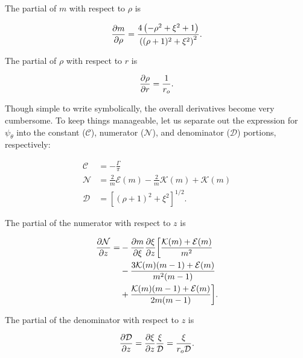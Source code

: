 \noindent The partial of \(m\) with respect to \(\rho\) is

\begin{equation}
    \frac{\partial m}{\partial \rho} = \frac{4\left(-\rho^2 + \xi^2 + 1\right)}{\left((\rho +1)^2 + \xi^2 \right)^2}.
\end{equation}

\noindent The partial of \(\rho\) with respect to \(r\) is

\begin{equation}
    \frac{\partial \rho}{\partial r} = \frac{1}{r_o}.
\end{equation}

Though simple to write symbolically, the overall derivatives become very cumbersome.
%
To keep things manageable, let us separate out the expression for \(\psi_\theta\) into the constant (\(\mathcal{C}\)), numerator (\(\mathcal{N}\)), and denominator (\(\mathcal{D}\)) portions, respectively:

\begin{equation}
    \label{eqn:cnd}
\begin{aligned}
    \mathcal{\mathcal{C}} &= -\frac{\Gamma}{\pi } \\
    \mathcal{\mathcal{N}} &= \frac{2}{m}\mathcal{E}(m) - \frac{2}{m}\mathcal{K}(m) + \mathcal{K}(m) \\
    \mathcal{\mathcal{D}} &= \left[(\rho+1)^2+\xi^2\right]^{1/2}.
\end{aligned}
\end{equation}

\noindent The partial of the numerator with respect to \(z\) is

\begin{equation}
    \begin{split}
        \frac{\partial \mathcal{N}}{\partial z} =& -\frac{\partial m}{\partial \xi}\frac{\partial \xi}{\partial z} \bigg[ \frac{\mathcal{K}(m)+\mathcal{E}(m)}{m^2}\\
         &- \frac{3\mathcal{K}(m)(m-1)+\mathcal{E}(m)}{m^2(m-1)}\\
         &+ \frac{\mathcal{K}(m)(m-1)+\mathcal{E}(m)}{2m(m-1)} \bigg].
    \end{split}
\end{equation}

\noindent The partial of the denominator with respect to \(z\) is

\begin{equation}
    \frac{\partial \mathcal{D}}{\partial z} = \frac{\partial \xi}{\partial z} \frac{\xi}{\mathcal{D}} = \frac{\xi}{r_o\mathcal{D}}.
\end{equation}

